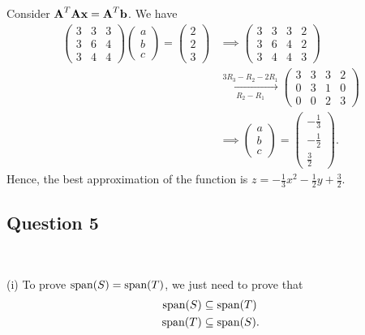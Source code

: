 \documentclass[12pt]{amsart}
\theoremstyle{plain}
\theoremstyle{definition}
\def\bf{\textbf}
\newcommand{\RA}{\implies}
\newcommand{\spa}{\textup{span}}
\begin{document}
Consider $\bf A^T\bf A\bf x=\bf A^T\bf b$. We have
\begin{align*}
	\left(
	\begin{array}{ccc}
		3 & 3 & 3\\
		3 & 6 & 4\\
		3 & 4 & 4
	\end{array}
	\right)
	\left(
	\begin{array}{ccc}
		a\\
		b\\
		c
	\end{array}
	\right)=
	\left(
	\begin{array}{ccc}
		2\\
		2\\
		3
	\end{array}
	\right)&\RA
	\left(
	\begin{array}{ccc|c}
		3 & 3 & 3 & 2\\
		3 & 6 & 4 & 2\\
		3 & 4 & 4 & 3
	\end{array}
	\right)\\
	&\xrightarrow[R_2-R_1]{3R_3-R_2-2R_1}
	\left(
	\begin{array}{ccc|c}
		3 & 3 & 3 & 2\\
		0 & 3 & 1 & 0\\
		0 & 0 & 2 & 3
	\end{array}
	\right)\\
	&\RA
	\left(
	\begin{array}{ccc}
		a\\
		b\\
		c
	\end{array}
	\right)=\left(
	\begin{array}{ccc}
		-\frac13\\
		-\frac12\\
		\frac32
	\end{array}
	\right).
\end{align*}
Hence, the best approximation of the function is $z=-\frac13x^2-\frac12y+\frac32$.

\newpage
\subsection*{Question 5}\ 

(i) To prove $\spa(S)=\spa (T)$, we just need to prove that 
\begin{align*}
	\spa(S)&\subseteq \spa(T)\\
	\spa(T)&\subseteq \spa(S).
\end{align*}
\end{document}
